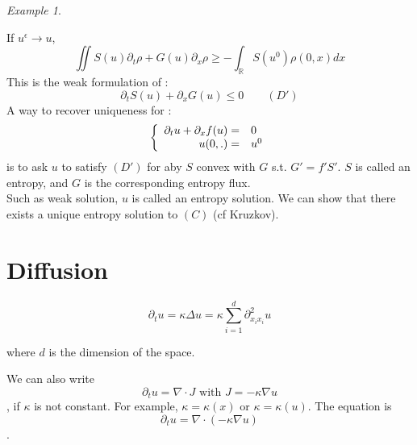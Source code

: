 \documentclass{report}
\newcommand{\R}{\ensuremath{\mathbb{R}}} %
\theoremstyle{plain}
\theoremstyle{definition}
\theoremstyle{remark}
\newtheorem*{ex}{Example}
\begin{document}
\begin{ex}
\begin{itemize}
\begin{equation*}
        \end{equation*}
        If $u^\epsilon \rightarrow u$, 
        \begin{equation}
            \iint S(u)\partial_t\rho + G(u)\partial_x\rho \ge - \int_\R S(u^0)\rho(0,x)dx
        \end{equation}
        This is the weak formulation of :
        \begin{equation}
            \partial_t S(u) + \partial_x G(u) \le 0 \qquad (D')
        \end{equation}
        A way to recover uniqueness for : 
        \begin{equation*}
        \left\lbrace
    	\begin{array}[]{rl}
    		 \partial_t u + \partial_x f(u) =& 0\\
    		 u(0,.) =& u^0
    	\end{array}\right.
        \end{equation*}
        is to ask $u$ to satisfy $(D')$ for aby $S$ convex with $G$ s.t. $G'=f'S'$.
        $S$ is called an entropy, and $G$ is the corresponding entropy flux. \\
        Such as weak solution, $u$ is called an entropy solution. We can show that there exists a unique entropy solution to $(C)$ (cf Kruzkov).
    \end{itemize}
    \end{ex}
    
    
    




\section{Diffusion}


\begin{equation}
	\partial_t u = \kappa\Delta u = \kappa \sum^d_{i=1} 
	\partial_{x_ix_i}^2 u
\end{equation}

where $d$ is the dimension of the space.

We can also write 
\begin{equation}
	\partial_t u = \nabla\cdot J
	\text{ with } J = -\kappa \nabla u
\end{equation},
if $\kappa$ is not constant. For example,
$\kappa = \kappa(x)$ or $\kappa=\kappa(u)$.
The equation is
\begin{equation}
	\partial_t u = \nabla\cdot (-\kappa \nabla u)
\end{equation}.
\end{document}
